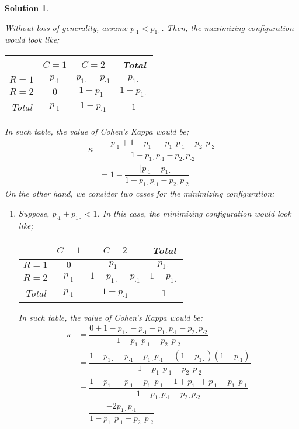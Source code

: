 \documentclass[12pt]{article}
\theoremstyle{problemstyle}
\newtheorem*{solution*}{Solution}
\begin{document}
\begin{solution*}
\begin{enumerate}
	Without loss of generality, assume $p_{\cdot 1} < p_{1\cdot}$. Then, the maximizing configuration would look like;
	\begin{table}[H]
		\centering 
		\begin{tabular}{cccc}
			\toprule
			& $C=1$ & $C=2$ & Total\\
			\midrule 
			$R = 1$ & $p_{\cdot 1}$ & $p_{1\cdot} - p_{\cdot 1}$ & $p_{1\cdot}$\\
			$R=2$ & $0$ & $1 - p_{1\cdot}$ & $1 - p_{1\cdot}$\\
			\midrule
			Total & $p_{\cdot 1}$ & $1 - p_{\cdot 1}$ & $1$\\
			\bottomrule
		\end{tabular}	
	\end{table}
	In such table, the value of Cohen's Kappa would be;
	\begin{align*}
		\kappa & = \dfrac{p_{\cdot 1} + 1 - p_{1\cdot} - p_{1\cdot}p_{\cdot 1} - p_{2\cdot}p_{\cdot 2}}{1 - p_{1\cdot}p_{\cdot 1} - p_{2\cdot}p_{\cdot 2} }\\
		& = 1  - \dfrac{\vert p_{\cdot 1} - p_{1\cdot}\vert }{ 1 - p_{1\cdot}p_{\cdot 1} - p_{2\cdot}p_{\cdot 2} }
	\end{align*}
	On the other hand, we consider two cases for the minimizing configuration;
	\begin{enumerate}
		\item[\textbf{Case 1:}] Suppose, $p_{\cdot 1} +  p_{1\cdot} < 1$. In this case, the minimizing configuration would look like;
		\begin{table}[H]
			\centering 
			\begin{tabular}{cccc}
				\toprule
				& $C=1$ & $C=2$ & Total\\
				\midrule 
				$R = 1$ & $0$ & $p_{1\cdot}$ & $p_{1\cdot}$\\
				$R=2$ & $p_{\cdot 1}$ & $1 - p_{1\cdot} - p_{\cdot 1}$ & $1 - p_{1\cdot}$\\
				\midrule
				Total & $p_{\cdot 1}$ & $1 - p_{\cdot 1}$ & $1$\\
				\bottomrule
			\end{tabular}	
		\end{table}
		In such table, the value of Cohen's Kappa would be;
		\begin{align*}
		\kappa & = \dfrac{0 + 1 - p_{1\cdot} - p_{\cdot 1} - p_{1\cdot}p_{\cdot 1} - p_{2\cdot}p_{\cdot 2}}{1 - p_{1\cdot}p_{\cdot 1} - p_{2\cdot}p_{\cdot 2} }\\
		& = \dfrac{1 - p_{1\cdot} - p_{\cdot 1} - p_{1\cdot}p_{\cdot 1} - (1 - p_{1\cdot})( 1- p_{\cdot 1})}{1 - p_{1\cdot}p_{\cdot 1} - p_{2\cdot}p_{\cdot 2} }\\
		& = \dfrac{1 - p_{1\cdot} - p_{\cdot 1} - p_{1\cdot}p_{\cdot 1} - 1 + p_{1\cdot} + p_{\cdot 1} - p_{1\cdot}p_{\cdot 1}}{1 - p_{1\cdot}p_{\cdot 1} - p_{2\cdot}p_{\cdot 2} }\\
		& = \dfrac{- 2p_{1\cdot}p_{\cdot 1} }{1 - p_{1\cdot}p_{\cdot 1} - p_{2\cdot}p_{\cdot 2} }
		\end{align*}
		

\end{enumerate}
\end{enumerate}
\end{solution*}
\end{document}
